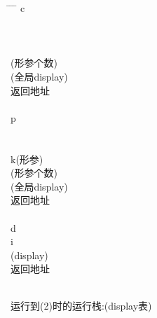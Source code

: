 \documentclass{article}
\begin{document}
\begin{tabbing}
    \hspace{1.5cm} \= \hspace{1.5cm} \= \hspace{1.5cm} \= \kill
     \> c\\

     \\

     \\

     \\

     (形参个数)\\

     (全局display)\\

     \> 返回地址\\

     \\

     \> p\\

     \\

     \\

     \> k(形参)\\

     (形参个数)\\

     (全局display)\\

     \> 返回地址\\

     \\

     \> d \\

     \> i\\

     (display)\\

     \> 返回地址\\

     \\

\end{tabbing}

运行到(2)时的运行栈:(display表)
\end{document}
